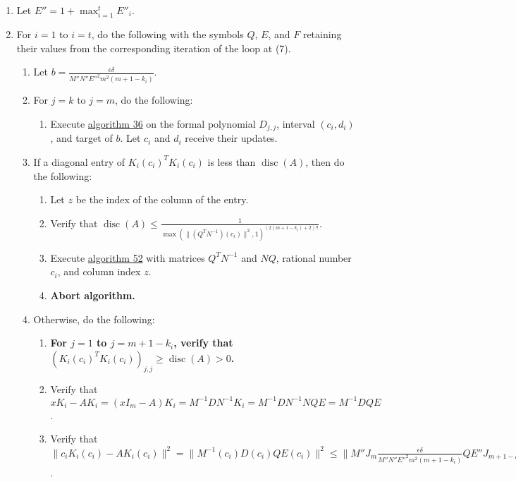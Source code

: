 \documentclass[twocolumn]{article}
\DeclareMathOperator{\disc}{disc}
\begin{document}
\begin{enumerate}
\begin{enumerate}
					\item Let $E'$ be the matrix obtained by replacing all the negative signs in $E$ with positive signs.
					\item Let $E''_i=\max_{j=1}^m\max_{l=1}^mE'(\max(\lvert c_1\rvert,\lvert d_t\rvert))_{j,l}$.
				\end{enumerate}
				\item Let $E''=1+\max_{i=1}^t E''_i$.
				\item For $i=1$ to $i=t$, do the following with the symbols $Q$, $E$, and $F$ retaining their values from the corresponding iteration of the loop at (7).
				\begin{enumerate}
					\item Let $b=\frac{\epsilon\delta}{M''N''E''^2m^2(m+1-k_i)}$.
					\item For $j=k$ to $j=m$, do the following:
					\begin{enumerate}
						\item Execute \hyperref[sec:algorithm 36]{algorithm 36} on the formal polynomial $D_{j,j}$, interval $(c_i, d_i)$, and target of $b$. Let $c_i$ and $d_i$ receive their updates.
					\end{enumerate}
					\item If a diagonal entry of ${K_i(c_i)}^TK_i(c_i)$ is less than $\disc(A)$, then do the following:
					\begin{enumerate}
						\item Let $z$ be the index of the column of the entry.
						\item Verify that $\disc(A)\le\frac{1}{\max(\lVert (Q^TN^{-1})(c_i)\rVert^2,1)^{(2(m+1-k_i)+2)!!}}$.
						\item Execute \hyperref[sec:algorithm 52]{algorithm 52} with matrices $Q^TN^{-1}$ and $NQ$, rational number $c_i$, and column index $z$.
						\item \textbf{Abort algorithm.}
					\end{enumerate}
					\item Otherwise, do the following:
					\begin{enumerate}
						\item \textbf{For $j=1$ to $j=m+1-k_i$, verify that $({K_i(c_i)}^TK_i(c_i))_{j,j}\ge \disc(A)>0$.}
						\item Verify that $xK_i-AK_i=(xI_m-A)K_i=M^{-1}DN^{-1}K_i=M^{-1}DN^{-1}NQE=M^{-1}DQE$.
						\item Verify that $\lVert c_iK_i(c_i)-AK_i(c_i)\rVert^2=\lVert M^{-1}(c_i)D(c_i)QE(c_i)\rVert^2\le\lVert M''J_m\frac{\epsilon\delta}{M''N''E''^2m^2(m+1-k_i)}QE''J_{m+1-k}\rVert^2=\lVert J_m\frac{\epsilon\delta}{N''E''m^2(m+1-k_i)}QJ_{m+1-k}\rVert^2=\lVert \frac{\epsilon\delta}{N''E''m^2}J_{m\times (m+1-k_i)}\rVert^2=\frac{m+1-k_i}{m^3}\cdot\frac{\epsilon^2\delta^2}{(N''E'')^2}$.

\end{enumerate}
\end{enumerate}
\end{enumerate}
\end{document}
